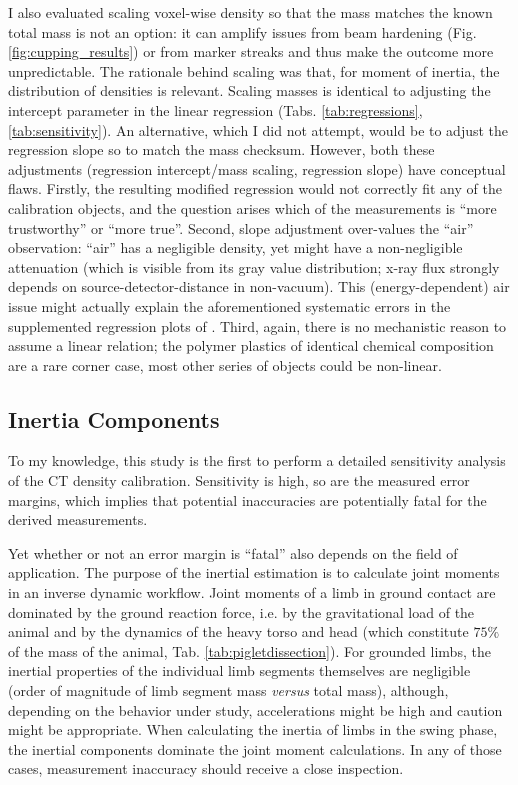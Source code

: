 I also evaluated scaling voxel-wise density so that the mass matches the known total mass is not an option: it can amplify issues from beam hardening (Fig. \ref{fig:cupping_results}) or from marker streaks and thus make the outcome more unpredictable.
The rationale behind scaling was that, for moment of inertia, the distribution of densities is relevant.
Scaling masses is identical to adjusting the intercept parameter in the linear regression (Tabs. \ref{tab:regressions}, \ref{tab:sensitivity}).
An alternative, which I did not attempt, would be to adjust the regression slope so to match the mass checksum.
However, both these adjustments (regression intercept/mass scaling, regression slope) have conceptual flaws.
Firstly, the resulting modified regression would not correctly fit any of the calibration objects, and the question arises which of the measurements is ``more trustworthy'' or ``more true''.
Second, slope adjustment over-values the ``air'' observation: ``air'' has a negligible density, yet might have a non-negligible attenuation (which is visible from its gray value distribution; x-ray flux strongly depends on source-detector-distance in non-vacuum).
This (energy-dependent) air issue might actually explain the aforementioned systematic errors in the supplemented regression plots of \citet{Durston2022}.
Third, again, there is no mechanistic reason to assume a linear relation; the polymer plastics of identical chemical composition are a rare corner case, most other series of objects could be non-linear.


\subsection{Inertia Components}
\label{sec:org9d61612}
To my knowledge, this study is the first to perform a detailed sensitivity analysis of the CT density calibration.
Sensitivity is high, so are the measured error margins, which implies that potential inaccuracies are potentially fatal for the derived measurements.

Yet whether or not an error margin is ``fatal'' also depends on the field of application.
The purpose of the inertial estimation is to calculate joint moments in an inverse dynamic workflow.
Joint moments of a limb in ground contact are dominated by the ground reaction force, i.e. by the gravitational load of the animal and by the dynamics of the heavy torso and head (which constitute \(75 \%\) of the mass of the animal, Tab. \ref{tab:pigletdissection}).
For grounded limbs, the inertial properties of the individual limb segments themselves are negligible (order of magnitude of limb segment mass \emph{versus} total mass), although, depending on the behavior under study, accelerations might be high and caution might be appropriate.
When calculating the inertia of limbs in the swing phase, the inertial components dominate the joint moment calculations.
In any of those cases, measurement inaccuracy should receive a close inspection.



